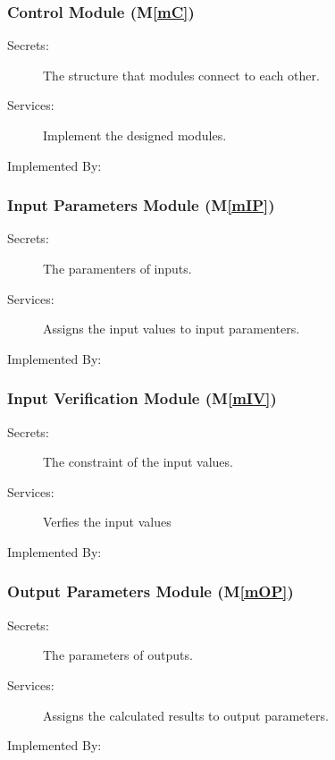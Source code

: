 \documentclass[12pt, titlepage]{article}
\newcommand{\mref}[1]{M\ref{#1}}
\begin{document}
\subsubsection{Control Module (\mref{mC})}

\begin{description}
\item[Secrets:] The structure that modules connect to each other.
\item[Services:] Implement the designed modules.
\item[Implemented By:] \progname
\end{description}

\subsubsection{Input Parameters Module (\mref{mIP})}

\begin{description}
\item[Secrets:] The paramenters of inputs.
\item[Services:] Assigns the input values to input paramenters.

\item[Implemented By:] \progname
\end{description}


\subsubsection{Input Verification Module (\mref{mIV})}

\begin{description}
\item[Secrets:] The constraint of the input values.
\item[Services:] Verfies the input values
\item[Implemented By:] \progname
\end{description}

\subsubsection{Output Parameters Module (\mref{mOP})}

\begin{description}
\item[Secrets:] The parameters of outputs.
\item[Services:] Assigns the calculated results to output parameters.
\item[Implemented By:] \progname
\end{description}
\end{document}
